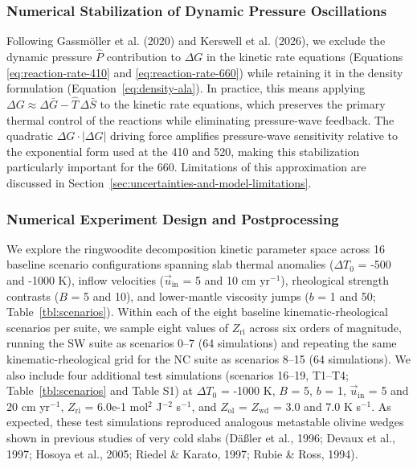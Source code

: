 \documentclass[draft,linenumbers]{agujournal2019}
\begin{document}
\subsubsection{Numerical Stabilization of Dynamic Pressure
Oscillations}\label{sec:numerical-stabilization-of-dynamic-pressure-oscillations}

Following Gassmöller et al. (2020) and Kerswell et al. (2026), we
exclude the dynamic pressure \(\hat{P}\) contribution to \(\Delta G\) in
the kinetic rate equations (Equations \ref{eq:reaction-rate-410} and
\ref{eq:reaction-rate-660}) while retaining it in the density
formulation (Equation~\ref{eq:density-ala}). In practice, this means
applying \(\Delta G \approx \Delta \bar{G} - \hat{T}\, \Delta \bar{S}\)
to the kinetic rate equations, which preserves the primary thermal
control of the reactions while eliminating pressure-wave feedback. The
quadratic \(\Delta G \cdot |\Delta G|\) driving force amplifies
pressure-wave sensitivity relative to the exponential form used at the
410 and 520, making this stabilization particularly important for the
660. Limitations of this approximation are discussed in
Section~\ref{sec:uncertainties-and-model-limitations}.

\subsubsection{Numerical Experiment Design and
Postprocessing}\label{sec:numerical-experiment-design-and-postprocessing}

We explore the ringwoodite decomposition kinetic parameter space across
16 baseline scenario configurations spanning slab thermal anomalies
(\(\Delta T_0\) = -500 and -1000 K), inflow velocities
(\(\vec{u}_\mathrm{in}\) = 5 and 10 cm yr\(^{-1}\)), rheological
strength contrasts (\(B\) = 5 and 10), and lower-mantle viscosity jumps
(\(b\) = 1 and 50; Table~\ref{tbl:scenarios}). Within each of the eight
baseline kinematic-rheological scenarios per suite, we sample eight
values of \(Z_\mathrm{ri}\) across six orders of magnitude, running the
SW suite as scenarios 0--7 (64 simulations) and repeating the same
kinematic-rheological grid for the NC suite as scenarios 8--15 (64
simulations). We also include four additional test simulations
(scenarios 16--19, T1--T4; Table~\ref{tbl:scenarios} and Table S1) at
\(\Delta T_0\) = -1000 K, \(B\) = 5, \(b\) = 1, \(\vec{u}_\mathrm{in}\)
= 5 and 20 cm yr\(^{-1}\), \(Z_\mathrm{ri}\) = 6.0e-1 mol\(^2\)
J\(^{-2}\) s\(^{-1}\), and \(Z_\mathrm{ol}\) = \(Z_\mathrm{wd}\) = 3.0
and 7.0 K s\(^{-1}\). As expected, these test simulations reproduced
analogous metastable olivine wedges shown in previous studies of very
cold slabs (Däßler et al., 1996; Devaux et al., 1997; Hosoya et al.,
2005; Riedel \& Karato, 1997; Rubie \& Ross, 1994).
\end{document}
